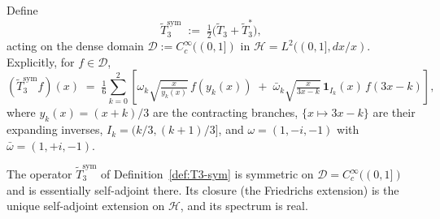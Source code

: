 \begin{defn}\label{def:T3-sym}
Define
\begin{equation}\label{eq:T3-sym}
\widetilde{T}_3^{\mathrm{sym}} \;:=\; \tfrac{1}{2}\bigl(\tilde{T}_3 + \tilde{T}_3^*\bigr),
\end{equation}
acting on the dense domain $\mathcal{D} := C_c^\infty((0,1])$ in $\mathcal{H} = L^2((0,1], dx/x)$. Explicitly, for $f \in \mathcal{D}$,
\begin{equation}\label{eq:T3-sym-explicit}
(\widetilde{T}_3^{\mathrm{sym}} f)(x) \;=\; \tfrac{1}{6}\sum_{k=0}^{2}\!\left[\omega_k \sqrt{\tfrac{x}{y_k(x)}}\, f(y_k(x)) \;+\; \bar\omega_k \sqrt{\tfrac{x}{3x-k}}\, \mathbf{1}_{I_k}(x)\, f(3x-k)\right],
\end{equation}
where $y_k(x) = (x+k)/3$ are the contracting branches, $\{x \mapsto 3x-k\}$ are their expanding inverses, $I_k = (k/3, (k+1)/3]$, and $\omega = (1, -i, -1)$ with $\bar\omega = (1, +i, -1)$.
\end{defn}

\begin{theorem}\label{thm:self-adjoint-transfer}
The operator $\widetilde{T}_3^{\mathrm{sym}}$ of Definition~\ref{def:T3-sym} is symmetric on $\mathcal{D} = C_c^\infty((0,1])$ and is essentially self-adjoint there. Its closure (the Friedrichs extension) is the unique self-adjoint extension on $\mathcal{H}$, and its spectrum is real.
\end{theorem}

